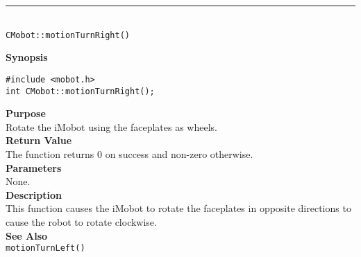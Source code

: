 \noindent
\vspace{5pt}
\rule{4.5in}{0.015in}\\
\noindent
{\LARGE \texttt{CMobot::motionTurnRight()}}\\
{}

\noindent
{\bf Synopsis}\\
\begin{verbatim}
#include <mobot.h>
int CMobot::motionTurnRight();
\end{verbatim}

\noindent
{\bf Purpose}\\
Rotate the iMobot using the faceplates as wheels.\\

\noindent
{\bf Return Value}\\
The function returns 0 on success and non-zero otherwise.\\

\noindent
{\bf Parameters}\\
None.\\

\noindent
{\bf Description}\\
This function causes the iMobot to rotate the faceplates in opposite directions
to cause the robot to rotate clockwise.\\

\noindent
{\bf See Also}\\
\texttt{motionTurnLeft()}

